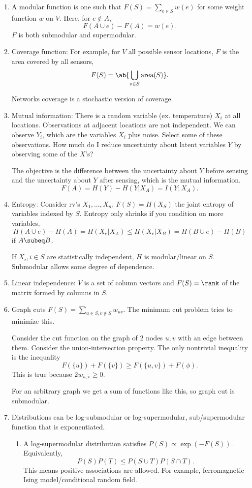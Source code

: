 \begin{enumerate}
\item
A modular function is one such that $F(S) = \sum_{e\in S} w(e)$ for some weight function $w$ on $V$. Here, for $e\nin A$, 
$$
F(A\cup e) - F(A) = w(e).
$$
$F$ is both submodular and supermodular.
\item
Coverage function: For example, for $V$ all possible sensor locations, $F$ is the area covered by all sensors,
$$
F(S)=\ab{
\bigcup_{v\in S} \text{area}(S)
}.
$$

Networks coverage is a stochastic version of coverage.
\item
Mutual information: 
There is a random variable  (ex. temperature) $X_i$ at all locations. Observations at adjacent locations are not independent. We can observe $Y_i$, which are the  variables $X_i$ plus noise. Select some of these observations. How much do I reduce uncertainty about latent variables $Y$ by observing some of the $X$'s?

The objective is the difference between the uncertainty about $Y$ before sensing and the uncertainty about $Y$ after sensing, which is the mutual information.
$$F(A) = H(Y) - H(Y|X_A) = I(Y;X_A).$$
\item
Entropy: Consider rv's $X_1,\ldots, X_n$,  $F(S) = H(X_S)$ the joint entropy of variables indexed by $S$.
Entropy only shrinks if you condition on more variables, 
$$H(A\cup e) - H(A) = 
H(X_e|X_A)\le H(X_e|X_B) = H(B\cup e) - H(B)$$ 
if $A\subeq B$.

If $X_i,i\in S$ are statistically independent, $H$ is modular/linear on $S$. Submodular allows some degree of dependence.

\item
Linear independence: %
$V$ is a set of column vectors and $F(S)= \rank $ of the matrix formed by columns in $S$.
\item
Graph cuts $F(S) = \sum_{u\in S,v\nin S}w_{uv}$. 
The minimum cut problem tries to minimize this.

Consider the cut function on the graph of 2 nodes $u,v$ with an edge between them. Consider the union-intersection property. The only nontrivial inequality is the inequality
$$
F(\{u\}) + F(\{v\}) \ge F(\{u,v\}) + F(\phi).
$$
This is true because $2w_{u,v}\ge 0$.

For an arbitrary graph we get a sum of functions like this, so graph cut is submodular.
\item
Distributions can be log-submodular or log-supermodular, sub/supermodular function that is exponentiated.
\begin{enumerate}
\item A log-supermodular distribution satisfies
 $P(S)\propto \exp(-F(S))$. 
Equivalently,
$$
P(S)P(T) \le P(S\cup T)P(S\cap T).
$$
This means positive associations are allowed. For example, ferromagnetic Ising model/conditional random field.


\end{enumerate}
\end{enumerate}
